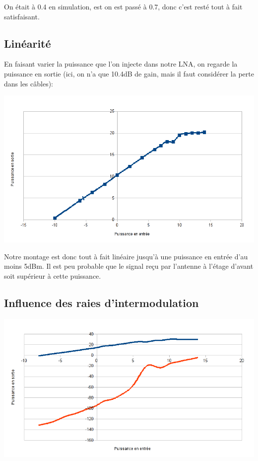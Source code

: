 \documentclass[12pt]{article}
\begin{document}
On était à 0.4 en simulation, est on est passé à 0.7, donc c’est resté tout à fait satisfaisant.

\subsection{Linéarité}

En faisant varier la puissance que l’on injecte dans notre LNA, on regarde la puissance en sortie (ici, on n’a que 10.4dB de gain, mais il faut considérer la perte dans les câbles):

\includegraphics[width=\linewidth]{img/linearite}

Notre montage est donc tout à fait linéaire jusqu’à une puissance en entrée d’au moins 5dBm. Il est peu probable que le signal reçu par l’antenne à l’étage d’avant soit supérieur à cette puissance.

\subsection{Influence des raies d’intermodulation}

\includegraphics[width=\linewidth]{img/IP3}
\end{document}
